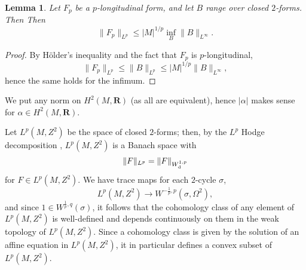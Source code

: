 \documentclass[reqno,11pt]{amsart}
\newcommand{\RR}{\mathbf{R}}
\newtheorem{lemma}[theorem]{Lemma}
\theoremstyle{definition}
\numberwithin{equation}{section}
\begin{document}
\begin{lemma}
Let $F_p$ be a $p$-longitudinal form, and let $B$ range over closed $2$-forms. Then
Then 
\begin{equation}\label{infinity magnetic rules p magnetic}
	\|F_p\|_{L^p} \leq |M|^{1/p} \inf_B \|B\|_{L^\infty}.
\end{equation}
\end{lemma}
\begin{proof}
By H\"older's inequality and the fact that $F_p$ is $p$-longitudinal,
$$\|F_p\|_{L^p} \leq \|B\|_{L^p} \leq |M|^{1/p} \|B\|_{L^\infty},$$
hence the same holds for the infimum.
\end{proof}

We put any norm on $H^2(M, \RR)$ (as all are equivalent), hence $|\alpha|$ makes sense for $\alpha \in H^2(M, \RR)$.

Let $L^p(M, Z^2)$ be the space of closed $2$-forms; then, by the $L^p$ Hodge decomposition \cite[Proposition 6.5]{Scott95}, $L^p(M, Z^2)$ is a Banach space with 
$$\|F\|_{L^p} = \|F\|_{W^{1, p}_{\rm d}}$$
for $F \in L^p(M, Z^2)$.
We have trace maps for each $2$-cycle $\sigma$,
$$L^p(M, Z^2) \to W^{-\frac{1}{p}, p}(\sigma, \Omega^2),$$
and since $1 \in W^{\frac{1}{p}, q}(\sigma)$, it follows that the cohomology class of any element of $L^p(M, Z^2)$ is well-defined and depends continuously on them in the weak topology of $L^p(M, Z^2)$.
Since a cohomology class is given by the solution of an affine equation in $L^p(M, Z^2)$, it in particular defines a convex subset of $L^p(M, Z^2)$.
\end{document}
